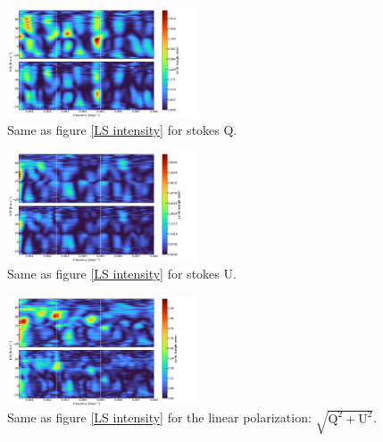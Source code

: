 \documentclass{aa}
\begin{document}
\begin{figure}[!h]
    \centering
    \includegraphics[width=0.5\textwidth]{Lomb-Scargle Stokes Q.png}
    \caption{Same as figure \ref{LS intensity} for stokes Q. }
    \label{LS Q}
\end{figure}

\begin{figure}[!h]
    \centering
    \includegraphics[width=0.5\textwidth]{Lomb-Scargle Stokes U.png}
    \caption{Same as figure \ref{LS intensity} for stokes U.}
    \label{LS U}
\end{figure}


\begin{figure}[!h]
    \centering
    \includegraphics[width=0.5\textwidth]{Lomb-Scargle linear polarization.png}
    \caption{Same as figure \ref{LS intensity} for the linear polarization: $\sqrt{\mathrm{Q^2}+\mathrm{U^2}}$.}
    \label{LS linear polarization}
\end{figure}



\end{document}
